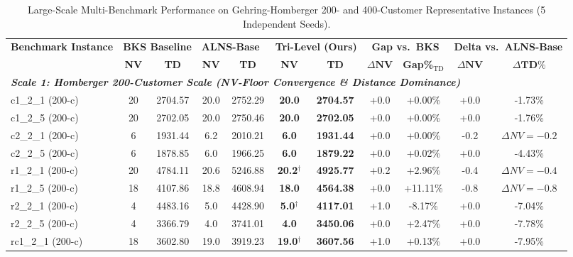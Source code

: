\begin{table}[!t]
\caption{Large-Scale Multi-Benchmark Performance on Gehring-Homberger 200- and 400-Customer Representative Instances (5 Independent Seeds).}
\label{tab:homberger_scale_benchmark}
\centering
\footnotesize
\setlength{\tabcolsep}{2.6pt}
\begin{tabular*}{\textwidth}{@{\extracolsep{\fill}} l cc cc cc cc cc @{}}
\toprule
\multirow{2}{*}{\textbf{Benchmark Instance}} & \multicolumn{2}{c}{\textbf{BKS Baseline}} & \multicolumn{2}{c}{\textbf{ALNS-Base~\cite{Ropke2006}}} & \multicolumn{2}{c}{\textbf{Tri-Level (Ours)}} & \multicolumn{2}{c}{\textbf{Gap vs.\ BKS}} & \multicolumn{2}{c}{\textbf{Delta vs.\ ALNS-Base}} \\
\cmidrule(lr){2-3} \cmidrule(lr){4-5} \cmidrule(lr){6-7} \cmidrule(lr){8-9} \cmidrule(lr){10-11}
 & \textbf{NV} & \textbf{TD} & \textbf{NV} & \textbf{TD} & \textbf{NV} & \textbf{TD} & $\Delta\textbf{NV}$ & \textbf{Gap\%}$_{\text{TD}}$ & $\Delta\textbf{NV}$ & $\Delta\textbf{TD}\%$ \\
\midrule
\multicolumn{11}{l}{\textit{\textbf{Scale 1: Homberger 200-Customer Scale (NV-Floor Convergence \& Distance Dominance)}}} \\
c1\_2\_1 (200-c) & 20 & 2704.57 & 20.0 & 2752.29 & \textbf{20.0} & \textbf{2704.57} & +0.0 & +0.00\% & +0.0 & -1.73\% \\
c1\_2\_5 (200-c) & 20 & 2702.05 & 20.0 & 2750.46 & \textbf{20.0} & \textbf{2702.05} & +0.0 & +0.00\% & +0.0 & -1.76\% \\
c2\_2\_1 (200-c) & 6 & 1931.44 & 6.2 & 2010.21 & \textbf{6.0} & \textbf{1931.44} & +0.0 & +0.00\% & -0.2 & $\Delta NV=-0.2$ \\
c2\_2\_5 (200-c) & 6 & 1878.85 & 6.0 & 1966.25 & \textbf{6.0} & \textbf{1879.22} & +0.0 & +0.02\% & +0.0 & -4.43\% \\
r1\_2\_1 (200-c) & 20 & 4784.11 & 20.6 & 5246.88 & \textbf{20.2}$^\dagger$ & \textbf{4925.77} & +0.2 & +2.96\% & -0.4 & $\Delta NV=-0.4$ \\
r1\_2\_5 (200-c) & 18 & 4107.86 & 18.8 & 4608.94 & \textbf{18.0} & \textbf{4564.38} & +0.0 & +11.11\% & -0.8 & $\Delta NV=-0.8$ \\
r2\_2\_1 (200-c) & 4 & 4483.16 & 5.0 & 4428.90 & \textbf{5.0}$^\dagger$ & \textbf{4117.01} & +1.0 & -8.17\% & +0.0 & -7.04\% \\
r2\_2\_5 (200-c) & 4 & 3366.79 & 4.0 & 3741.01 & \textbf{4.0} & \textbf{3450.06} & +0.0 & +2.47\% & +0.0 & -7.78\% \\
rc1\_2\_1 (200-c) & 18 & 3602.80 & 19.0 & 3919.23 & \textbf{19.0}$^\dagger$ & \textbf{3607.56} & +1.0 & +0.13\% & +0.0 & -7.95\% \\

\end{tabular*}
\end{table}
